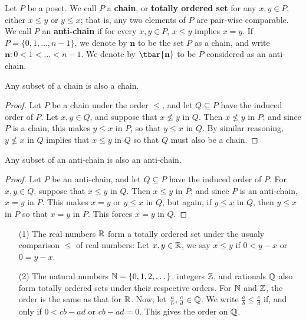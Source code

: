 \begin{definition}
  Let $P$ be a poset. We call $P$ a \textbf{chain}, or \textbf{totally
  ordered set} for any $x,y \in P$, either $x \leq y$ or $y \leq x$;
  that is, any two elements of $P$ are pair-wise comparable. We call
  $P$ an  \textbf{anti-chain} if for every $x,y \in P$, $x \leq y$
  implies $x=y$. If $P=\{0, 1, \dots, n-1\}$, we denote by
  $\textbf{n}$ to be the set $P$ as a chain, and write
  $\textbf{n}:0<1< \dots < n-1$. We denote by $\tbar{\textbf{n}}$ to be
  $P$ considered as an anti-chain.
\end{definition}

\begin{proposition}\label{proposition_1.1.1}
  Any subset of a chain is also a chain.
\end{proposition}
\begin{proof}
  Let $P$ be a chain under the order $\leq$, and let $Q \subseteq P$
  have the induced order of $P$. Let  $x,y \in Q$, and suppose that $x
  \nleq y$ in $Q$. Then  $x \nleq y$ in $P$; and since $P$ is a chain,
  this makes  $y \leq x$ in $P$, so that  $y \leq x$ in $Q$.
  By similar reasoning,  $y \nleq x$ in $Q$ implies that $x \leq y$ in
  $Q$ so that $Q$ must also be a chain.
\end{proof}

\begin{proposition}\label{proposition_1.1.2}
  Any subset of an anti-chain is also an anti-chain.
\end{proposition}
\begin{proof}
  Let $P$ be an anti-chain, and let $Q \subseteq P$ have the induced
  order of $P$. For  $x,y \in Q$, suppose that $x \leq y$ in $Q$. Then
   $x \leq y$ in $P$; and since $P$ is an anti-chain, $x=y$ in $P$.
   This makes $x=y$ or  $y \leq x$ in $Q$, but again, if  $y \leq x$
   in $Q$, then  $y \leq x$ in $P$ so that $x=y$ in $P$. This forces
   $x=y$ in $Q$.
\end{proof}

\begin{example}\label{example_1.2}
  \begin{enumerate}
    \item[(1)] The real numbers $\mathbb{R}$ form a totally ordered set under
      the usualy comparison $\leq$ of real numbers: Let $x,y \in \mathbb{R}$,
      we say $x \leq y$ if $0<y-x$ or $0=y-x$.

    \item[(2)] The natural numbers $\mathbb{N}=\{0, 1, 2, \dots\}$, integers
      $\mathbb{Z}$, and rationals $\mathbb{Q}$ also form totally ordered sets under
      their respective orders. For $\mathbb{N}$ and $\mathbb{Z}$, the order is the
      same as that for $\mathbb{R}$. Now, let $\frac{a}{b}, \frac{c}{d} \in
      \mathbb{Q}$. We write $\frac{a}{b} \leq \frac{c}{d}$ if, and only if
      $0<cb-ad$ or  $cb-ad=0$. This gives the order on $\mathbb{Q}$.
  \end{enumerate}
\end{example}

